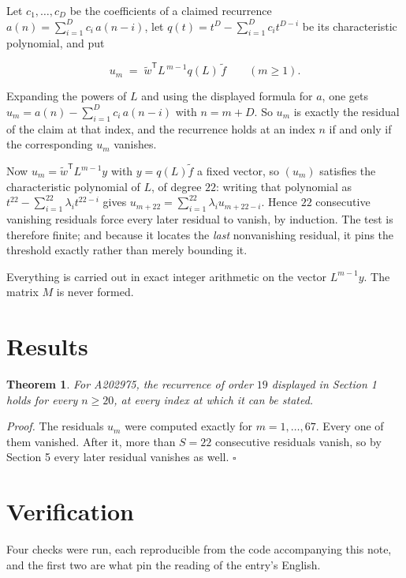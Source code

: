 \documentclass[11pt]{article}
\newtheorem{theorem}{Theorem}
\theoremstyle{definition}
\begin{document}
Let $c_1,\dots,c_D$ be the coefficients of a claimed recurrence $a(n) = \sum_{i=1}^{D} c_i\,a(n-i)$, let $q(t) = t^{D} - \sum_{i=1}^{D} c_i t^{D-i}$ be its characteristic polynomial, and put

\[u_m \;=\; \tilde w^{\mathsf T} L^{\,m-1} q(L)\,\tilde f \qquad (m \ge 1).\]

Expanding the powers of $L$ and using the displayed formula for $a$, one gets $u_m = a(n) - \sum_{i=1}^{D} c_i\,a(n-i)$ with $n = m + D$. So $u_m$ is exactly the residual of the claim at that index, and the recurrence holds at an index $n$ if and only if the corresponding $u_m$ vanishes.

Now $u_m = \tilde w^{\mathsf T} L^{m-1} y$ with $y = q(L)\tilde f$ a fixed vector, so $(u_m)$ satisfies the characteristic polynomial of $L$, of degree $22$: writing that polynomial as $t^{22} - \sum_{i=1}^{22} \lambda_i t^{22-i}$ gives $u_{m+22} = \sum_{i=1}^{22} \lambda_i u_{m+22-i}$. Hence $22$ consecutive vanishing residuals force every later residual to vanish, by induction. The test is therefore finite; and because it locates the {\itshape last} nonvanishing residual, it pins the threshold exactly rather than merely bounding it.

Everything is carried out in exact integer arithmetic on the vector $L^{m-1}y$. The matrix $M$ is never formed.

\section{Results}

\begin{theorem} For A202975, the recurrence of order $19$ displayed in Section 1 holds for every $n \ge 20$, at every index at which it can be stated.\end{theorem}

{\itshape Proof.} The residuals $u_m$ were computed exactly for $m = 1,\dots,67$. Every one of them vanished. After it, more than $S = 22$ consecutive residuals vanish, so by Section 5 every later residual vanishes as well. $\square$

\section{Verification}

Four checks were run, each reproducible from the code accompanying this note, and the first two are what pin the reading of the entry's English.
\end{document}
